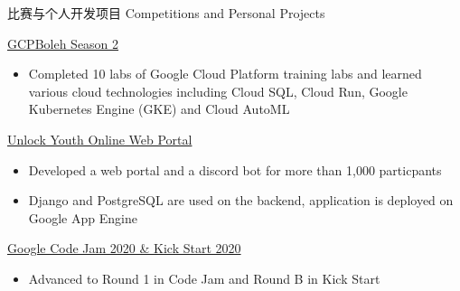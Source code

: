 \documentclass{article}
\newlength{\tabin}
\newlength{\secsep}
\newcommand{\lineunder}{\vspace*{-8pt} \\ \hspace*{-6pt} \hrulefill \\ \vspace*{-15pt}}
\newenvironment{tabbedsection}[1]{
  \begin{list}{}{
      \setlength{\itemsep}{0pt}
      \setlength{\labelsep}{0pt}
      \setlength{\labelwidth}{0pt}
      \setlength{\leftmargin}{\tabin}
      \setlength{\rightmargin}{\tabin}
      \setlength{\listparindent}{0pt}
      \setlength{\parsep}{0pt}
      \setlength{\parskip}{0pt}
      \setlength{\partopsep}{0pt}
      \setlength{\topsep}{#1}
    }
  \item[]
}{\end{list}}
\newenvironment{resume_section}[1]{
  \filbreak
  \vspace{2\secsep}
  \textsc{\large#1}
  \lineunder
  \begin{tabbedsection}{\secsep}
}{\end{tabbedsection}}
\newenvironment{resume_subsection}[2][]{
  \textbf{#2} \hfill {\footnotesize #1} \hspace{2em}
  \begin{tabbedsection}{0.5\secsep}
}{\end{tabbedsection}}
\newenvironment{subitems}{
  \renewcommand{\labelitemi}{-}
  \begin{itemize}
      \setlength{\labelsep}{1em}
}{\end{itemize}}
\begin{document}
\begin{resume_section}{比赛与个人开发项目 Competitions and Personal Projects}
  \begin{resume_subsection}[(2020年10月 - 2020年11月)]{\href{https://www.qwiklabs.com/public_profiles/d668c6be-b102-411f-8c49-512de455899f}{GCPBoleh Season 2}}
    \begin{subitems}
      \item Completed 10 labs of Google Cloud Platform training labs and learned various cloud technologies including Cloud SQL, Cloud Run, Google Kubernetes Engine (GKE) and Cloud AutoML
    \end{subitems}
  \end{resume_subsection}

  \begin{resume_subsection}[(2020年5月 - 2020年6月)]{\href{https://github.com/marcustut/UnlockProject}{Unlock Youth Online Web Portal}}
    \begin{subitems}
      \item Developed a web portal and a discord bot for more than 1,000 particpants
      \item Django and PostgreSQL are used on the backend, application is deployed on Google App Engine
    \end{subitems}
  \end{resume_subsection}

  \begin{resume_subsection}[(2020年3月 - 2020年4月)]{\href{https://drive.google.com/drive/folders/1PXG8UBWxGFG66U_oSWwOouJDr8cWGGAu?usp=sharing}{Google Code Jam 2020 \& Kick Start 2020}}
    \begin{subitems}
      \item Advanced to Round 1 in Code Jam and Round B in Kick Start
    \end{subitems}
  \end{resume_subsection}
\end{resume_section}
\end{document}
